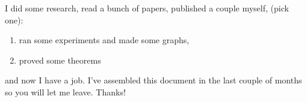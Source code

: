 
\vcinfo{}

I did some research, read a bunch of papers, published a couple myself, (pick one):
\begin{enumerate}
	\item ran some experiments and made some graphs,
	\item proved some theorems
\end{enumerate}
and now I have a job.  I've assembled this document in the last couple of months so you will let me leave.  Thanks!